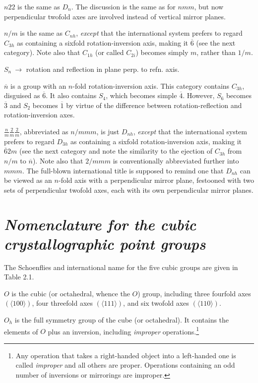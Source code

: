 $n22$ is the same as $D_{n}$. The discussion is the same as for $nmm$, but now perpendicular twofold axes are involved instead of vertical mirror planes.

$n/m$ is the same as $C_{nh}$, {\em except} that the international system prefers to regard $C_{3h}$ as containing a sixfold rotation-inversion axis, making it $\overline{6}$ (see the next category). Note also that $C_{1h}$ (or called $C_{2i}$) becomes simply $m$, rather than $1/m$.

$S_{n} \ \to$ rotation and reflection in plane perp. to refn. axis.

$\overline{n}$ is a group with an $n$-fold rotation-inversion axis. This category contains $C_{3h}$, disguised as $\overline{6}$. It also contains $S_{4}$, which becomes simple $\overline{4}$. However, $S_{6}$ becomes $\overline{3}$ and $S_{2}$ becomes $\overline{1}$ by virtue of the difference between rotation-reflection and rotation-inversion axes.

$\frac{n}{m}\frac{2}{m}\frac{2}{m}$, abbreviated as $n/mmm$, is just $D_{nh}$, {\em except} that the international system prefers to regard $D_{3h}$ as containing a sixfold rotation-inversion axis, making it $\overline{6}2m$ (see the next category and note the similarity to the ejection of $C_{3h}$ from $n/m$ to $\overline{n}$). Note also that $2/mmm$ is conventionally abbreviated further into $mmm$. The full-blown international title is supposed to remind one that $D_{nh}$ can be viewed as an $n$-fold axis with a perpendicular mirror plane, festooned with two sets of perpendicular twofold axes, each with its own perpendicular mirror planes.


\section*{\em Nomenclature for the cubic crystallographic point groups}

The Schoenflies and international name for the five cubic groups are given in Table 2.1.

$O$ is the cubic (or octahedral, whence the $O$) group, including three fourfold axes $(\langle 100\rangle)$, four threefold axes $(\langle 111\rangle)$, and six twofold axes $(\langle 110 \rangle)$.

$O_{h}$ is the full symmetry group of the cube (or octahedral). It contains the elements of $O$ plus an inversion, including {\em improper} operations.\footnote{Any operation that takes a right-handed object into a left-handed one is called {\em improper} and all others are proper. Operations containing an odd number of inversions or mirrorings are improper.}

